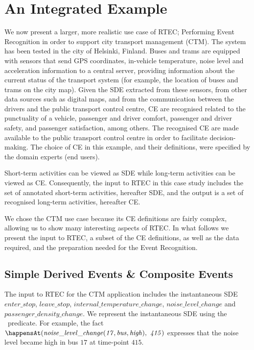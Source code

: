 \section{An Integrated Example}

We now present a larger, more realistic use case of RTEC; Performing Event Recognition in order to support city transport management (CTM). The system has been tested in the city of Helsinki, Finland. Buses and trams are equipped with sensors that send GPS coordinates, in-vehicle temperature, noise level and acceleration information to a central server, providing information about the current status of the transport system (for example, the location of buses and trams on the city map). Given the SDE extracted from these sensors, from other data sources such as digital maps, and from the communication between the drivers and the public transport control centre, CE are recognised related to the punctuality of a vehicle, passenger and driver comfort, passenger and driver safety, and passenger satisfaction, among others. The recognised CE are made available to the public transport control centre in order to facilitate decision-making. The choice of CE in this example, and their definitions, were specified by the domain experts (end users).

Short-term activities can be viewed as SDE while long-term activities can be viewed as CE. Consequently, the input to RTEC in this case study includes the set of annotated short-term activities, hereafter SDE, and the output is a set of recognised long-term activities, hereafter CE.

We chose the CTM use case because its CE definitions are fairly complex, allowing us to show many interesting aspects of RTEC. In what follows we present the input to RTEC, a subset of the CE definitions, as well as the data required, and the preparation needed for the Event Recognition.

\subsection{Simple Derived Events \& Composite Events}\label{sec:ctm-input} 

The input to RTEC for the CTM application includes the instantaneous SDE $\mathit{enter\_stop}$, $\mathit{leave\_stop}$, $\mathit{internal\_temperature\_change}$, $\mathit{noise\_level\_change}$ and $\mathit{passenger\_density\_change}$. We represent the instantaneous SDE using the \happensAt\ predicate. For example, the fact \linebreak$\happensAt\mathit{(noise\_level\_change(17, bus, high),\ 415)}$ expresses that the noise level became high in bus $\mathit{17}$ at time-point $\mathit{415}$.

